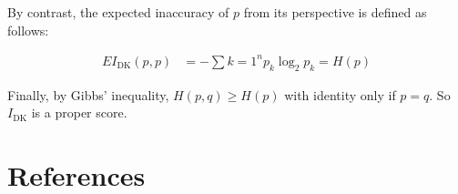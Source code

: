 \documentclass[
  letterpaper,
  DIV=11,
  numbers=noendperiod]{scrartcl}
\begin{document}
By contrast, the expected inaccuracy of \(p\) from its perspective is
defined as follows:

\begin{align*}
\mathit{EI}_{\text{DK}}(p,p) & = - \sum{k =1}^n p_k \log_2 p_k = H(p)
\end{align*}

Finally, by Gibbs' inequality, \(H(p,q) \geq H(p)\) with identity only
if \(p = q\). So \(I_{\text{DK}}\) is a proper score.

\section{References}\label{references}
\end{document}
